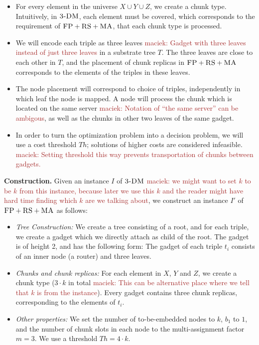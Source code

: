 \documentclass[9pt]{sigcomm-alternate}
\newcommand{\maciek}[1]{\textcolor{brown}{maciek: #1}}
\newcommand{\stefan}[1]{\textcolor{blue}{stefan: #1}}
\newcommand{\MaFactor}{m}
\newcommand{\FP}{\textsc{FP}}
\newcommand{\RS}{\textsc{RS}}
\newcommand{\MA}{\textsc{MA}}
\newcommand{\Tree}{\ensuremath{T}}
\newcommand{\CostTrans}{\ensuremath{b_1}}
\newcommand{\TDM}{\textsc{3-DM}}
\newcommand{\Thr}{\ensuremath{Th}}
\begin{document}
 \begin{itemize}
 \item For every element in the universe $X\cup Y\cup
 Z$, we create a chunk type. Intuitively, in $\TDM$,
 each element must be covered, which corresponds to the requirement
 of $\FP+\RS+\MA$,
 that each chunk type is processed.

 \item We will encode each triple as three leaves \maciek{Gadget with three leaves instead of just three leaves} in
 a substrate tree $\Tree$. The three leaves are close to each
 other in $\Tree$, and the placement of chunk replicas in $\FP+\RS+\MA$
 corresponds to the elements of the
 triples in these leaves.

 \item The node placement will correspond to choice of triples,
 independently in which leaf the node is mapped.
 A node will process the chunk which is located on the same server \maciek{Notation of ``the same server'' can be ambigous},
 as well as the chunks in other two leaves of the same gadget.

\item In order to turn the optimization problem into a decision problem, we will use
a cost threshold $\Thr$; solutions of higher costs are considered infeasible. \maciek{Setting threshold this way prevents transportation of chunks between gadgets.}

\end{itemize}


\textbf{Construction.}
Given an instance $I$ of $\TDM$ \maciek{we might want to set $k$ to be $k$ from this instance, because later we use this $k$ and the reader might have hard time finding which $k$ are we talking about}, we construct an instance $I'$ of
$\FP+\RS+\MA$ as follows:
\begin{itemize}
\item \emph{Tree Construction:} We create a tree consisting of a root,
and for each triple, we create a gadget which we directly attach as
child of the root. The gadget is of height 2,
and has the following form:
The gadget of each triple $t_i$ consists of an inner node (a router) and three leaves.
\item \emph{Chunks and chunk replicas:} For each element in $X$, $Y$ and $Z$,
 we create a chunk type
($3 \cdot k$ in total \maciek{This can be alternative place where we tell that $k$ is from the instance}). Every gadget
contains three chunk replicas, corresponding to the elements of $t_i$.
\item \emph{Other properties:} We set the number of to-be-embedded nodes to $k$,
$\CostTrans$ to $1$, and the number of chunk slots in each node to the multi-assignment factor
$\MaFactor=3$.
We use a threshold $\Thr= 4
\cdot k$.
\end{itemize}
\end{document}
